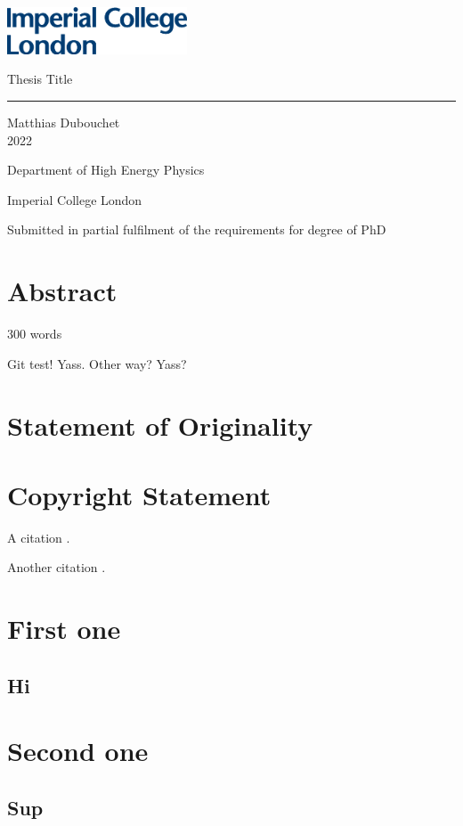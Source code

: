 \documentclass[11pt, a4paper, twoside]{report}
\begin{document}
\includegraphics[width=0.4\textwidth]{IMP_ML_1CS_4CP.eps}
\vfill
\begin{center}
    
    {\huge Thesis Title}
    
    \rule{7cm}{1pt}
    \vspace{2cm}
    
    Matthias Dubouchet\\
    2022
    \vspace{2cm}
    
    Department of High Energy Physics
    
    Imperial College London
    \vspace{2cm}
    
    Submitted in partial fulfilment of the requirements for degree of PhD
    
\end{center}

\vfill
\clearpage

\tableofcontents
\listoffigures
\listoftables
\printglossary[type=\acronymtype]

\chapter*{Abstract}

300 words

Git test! Yass. Other way? Yass?

\blindtext

\chapter*{Statement of Originality}
\blindtext

\chapter*{Copyright Statement}








A citation \cite{butter_how_2019}.

Another citation \cite{butter_how_2019}.

\appendix
\chapter{First one}
\section{Hi}
\chapter{Second one}
\section{Sup}

\printbibliography
\end{document}
